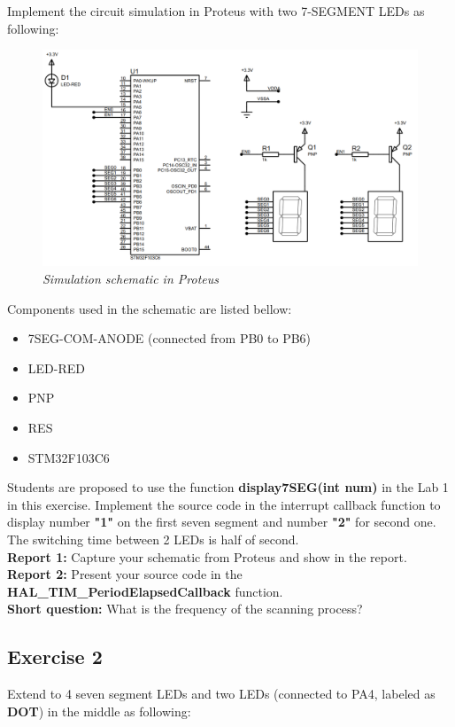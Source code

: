 Implement the circuit simulation in Proteus with two 7-SEGMENT LEDs as following:

\begin{figure}[!htp]
    \centering
    \includegraphics[width=5.5in]{source/picture/bai_2/lab2_ex1a.PNG}
    \caption{\textit{Simulation schematic in Proteus}}
    \label{bai2_pic1a}
\end{figure}
Components used in the schematic are listed bellow:
\begin{itemize}
    \item 7SEG-COM-ANODE (connected from PB0 to PB6)
    \item LED-RED
    \item PNP
    \item RES
    \item STM32F103C6
\end{itemize}


Students are proposed to use the function \textbf{display7SEG(int num)} in the Lab 1 in this exercise. Implement the source code in the interrupt callback function to display number \textbf{"1"} on the first seven segment and number \textbf{"2"} for second one. The switching time between 2 LEDs is half of second. \\

\textbf{Report 1: } Capture your schematic from Proteus and show in the report.\\

\textbf{Report 2: } Present your source code in the \textbf{HAL\_TIM\_PeriodElapsedCallback} function.\\

\textbf{Short question: } What is the frequency of the scanning process?\\

\subsection{Exercise 2}
Extend to 4 seven segment LEDs and two LEDs (connected to PA4, labeled as \textbf{DOT}) in the middle as following:

